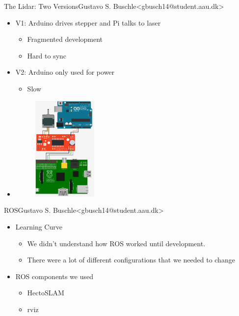 \begin{frame}{The Lidar: Two Versions}{Gustavo S. Buschle\newline<gbusch14@student.aau.dk>}
    \begin{itemize}
        \item <1-> V1: Arduino drives stepper and Pi talks to laser
            \begin{itemize}
                \item <2-> Fragmented development
                \item <3-> Hard to sync
            \end{itemize}
        \item <4-> V2: Arduino only used for power 
            \begin{itemize}
                \item <5-> Slow
            \end{itemize}
        \item <4-> \begin{figure}[h!]
            \includegraphics[width=0.3\textwidth]{images/steppermotor.png}
        \end{figure}
    \end{itemize}
\end{frame}

\begin{frame}{ROS}{Gustavo S. Buschle\newline<gbusch14@student.aau.dk>}
    \begin{itemize}
        \item <1-> Learning Curve
            \begin{itemize}
                \item <1-> We didn't understand how ROS worked until development.
                \item <2-> There were a lot of different configurations that we needed to change
            \end{itemize}
        \item <3-> ROS components we used
            \begin{itemize}
                \item <4-> HectoSLAM
                \item <5-> rviz
            \end{itemize}
    \end{itemize}
\end{frame}

